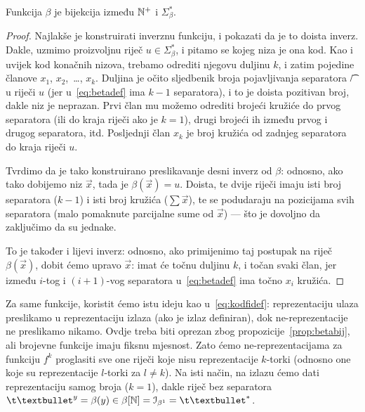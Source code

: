 \begin{propozicija}\label{prop:betabij}
Funkcija $\beta$ je bijekcija između ${\mathbb N}^+$ i $\Sigma_\beta^*$.
\end{propozicija}
\begin{proof}
Najlakše je konstruirati inverznu funkciju, i pokazati da je to doista inverz. Dakle, uzmimo proizvoljnu riječ $u\in\Sigma_\beta^*$, i pitamo se kojeg niza je ona kod. Kao i uvijek kod konačnih nizova, trebamo odrediti njegovu duljinu $k$, i zatim pojedine članove $x_1$, $x_2$,~\ldots, $x_k$. Duljina je očito sljedbenik broja pojavljivanja separatora \t/ u riječi $u$ (jer u~\eqref{eq:betadef} ima $k-1$ separatora), i to je doista pozitivan broj, dakle niz je neprazan. Prvi član mu možemo odrediti brojeći kružiće do prvog separatora (ili do kraja riječi ako je $k=1$), drugi brojeći ih između prvog i drugog separatora, itd. Posljednji član $x_k$ je broj kružića od zadnjeg separatora do kraja riječi $u$.

Tvrdimo da je tako konstruirano preslikavanje desni inverz od $\beta$: odnosno, ako tako dobijemo niz $\vec x$, tada je $\beta(\vec x)=u$. Doista, te dvije riječi imaju isti broj separatora ($k-1$) i isti broj kružića ($\sum\vec x$), te se podudaraju na pozicijama svih separatora (malo pomaknute parcijalne sume od $\vec x$) --- što je dovoljno da zaključimo da su jednake.

To je također i lijevi inverz: odnosno, ako primijenimo taj postupak na riječ $\beta(\vec x)$, dobit ćemo upravo $\vec x$: imat će točnu duljinu $k$, i točan svaki član, jer između $i$-tog i $(i+1)$-vog separatora u~\eqref{eq:betadef} ima točno $x_i$ kružića.
\end{proof}

Za same funkcije, koristit ćemo istu ideju kao u~\eqref{eq:kodfidef}: reprezentaciju ulaza preslikamo u reprezentaciju izlaza (ako je izlaz definiran), dok ne-reprezentacije ne preslikamo nikamo. Ovdje treba biti oprezan zbog propozicije~\ref{prop:betabij}, ali brojevne funkcije imaju fiksnu mjesnost. Zato ćemo ne-reprezentacijama za funkciju $f^k$ proglasiti sve one riječi koje nisu reprezentacije $k$-torki (odnosno one koje su reprezentacije $l$-torki za $l\not=k$). Na isti način, na izlazu ćemo dati reprezentaciju samog broja ($k=1$), dakle riječ bez separatora $\t\textbullet^y=\beta(y)\in\beta[\N]=\im{\beta^1}=\t\textbullet^*$.

